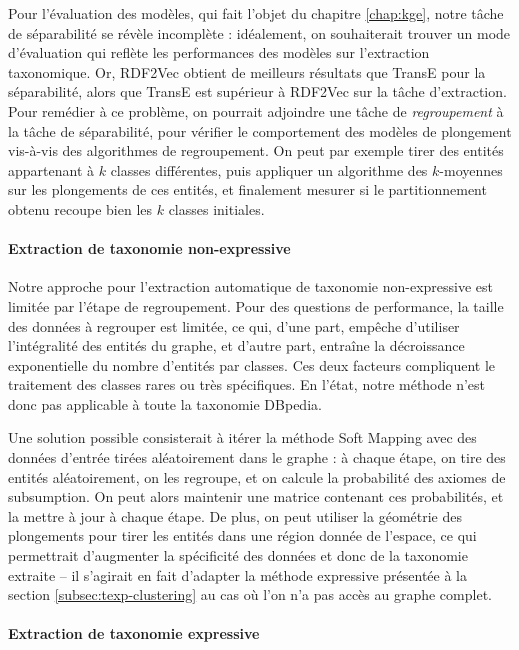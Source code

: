 Pour l'évaluation des modèles, qui fait l'objet du chapitre \ref{chap:kge}, notre tâche de séparabilité se révèle incomplète : idéalement, on souhaiterait trouver un mode d'évaluation qui reflète les performances des modèles sur l'extraction taxonomique. Or, RDF2Vec obtient de meilleurs résultats que TransE pour la séparabilité, alors que TransE est supérieur à RDF2Vec sur la tâche d'extraction.  
Pour remédier à ce problème, on pourrait adjoindre une tâche de \textit{regroupement} à la tâche de séparabilité, pour vérifier le comportement des modèles de plongement vis-à-vis des algorithmes de regroupement. 
On peut par exemple tirer des entités appartenant à $k$ classes différentes, puis appliquer un algorithme des $k$-moyennes sur les plongements de ces entités, et finalement mesurer si le partitionnement obtenu recoupe bien les $k$ classes initiales.

\paragraph{Extraction de taxonomie non-expressive}

Notre approche pour l'extraction automatique de taxonomie non-expressive est limitée par l'étape de regroupement. Pour des questions de performance, la taille des données à regrouper est limitée, ce qui, d'une part, empêche d'utiliser l'intégralité des entités du graphe, et d'autre part, entraîne la décroissance exponentielle du nombre d'entités par classes. Ces deux facteurs compliquent le traitement des classes rares ou très spécifiques. En l'état, notre méthode n'est donc pas applicable à toute la taxonomie DBpedia.

Une solution possible consisterait à itérer la méthode Soft Mapping avec des données d'entrée tirées aléatoirement dans le graphe : à chaque étape, on tire des entités aléatoirement, on les regroupe, et on calcule la probabilité des axiomes de subsumption. On peut alors maintenir une matrice contenant ces probabilités, et la mettre à jour à chaque étape. De plus, on peut utiliser la géométrie des plongements pour tirer les entités dans une région donnée de l'espace, ce qui permettrait d'augmenter la spécificité des données et donc de la taxonomie extraite – il s'agirait en fait d'adapter la méthode expressive présentée à la section \ref{subsec:texp-clustering} au cas où l'on n'a pas accès au graphe complet.


\paragraph{Extraction de taxonomie expressive}


